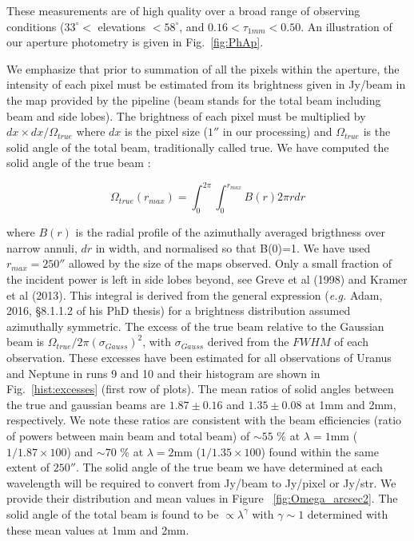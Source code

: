 These measurements are of high quality over a broad range of observing conditions
($33^{\circ}<$ elevations $<58^{\circ}$, and   $0.16 < \tau_{1mm} < 0.50$.
An illustration of our aperture photometry is given in Fig.~\ref{fig:PhAp}.

We emphasize that prior to summation of all the pixels within the aperture, the intensity of each pixel must be estimated
from its brightness  given in Jy/beam in the map provided by the
pipeline (beam stands  for the total beam including beam and side lobes).
The brightness of each pixel must be multiplied by
$dx \times dx / \Omega_{true}$ where  $dx$ is the pixel size ($1''$ in our processing)
and $\Omega_{true}$  is the solid angle of the total beam, traditionally called true.
We have computed the solid angle of the true beam :

$$ \Omega_{true} (r_{max}) = \int_0^{2\pi} \int_0^{r_{max}} B(r) 2 \pi r dr$$

\noindent where $B(r)$ is the radial profile of the azimuthally averaged brigthness over narrow annuli,  $dr$ in width, and normalised so that B(0)=1.
We have used  $r_{max}=250''$ allowed by the size of the maps observed. Only a small fraction of the incident power is
left in side lobes beyond, see Greve et al (1998) and Kramer et al (2013).
This integral is derived from the general expression ({\it e.g.} Adam, 2016, \S 8.1.1.2 of his PhD thesis) for a
brightness distribution assumed azimuthally symmetric.  The excess
of the true beam relative to the Gaussian beam is $\Omega_{true} / 2 \pi (\sigma_{Gauss})^2$, with  $\sigma_{Gauss}$ derived from
the $FWHM$ of each observation. These excesses have been 
estimated  for all observations of Uranus and Neptune in runs 9 and 10 and their histogram are shown
in Fig.~\ref{hist:excesses} (first row of plots). The mean
ratios of solid angles between the true and gaussian beams are
$1.87\pm0.16$  and $1.35\pm0.08$ at 1mm and 2mm, respectively. We note these ratios are consistent with
the beam efficiencies (ratio of powers between main beam  and   total beam)
of $\sim 55$ \% at $\lambda=1$mm ($1/1.87 \times 100$) and $\sim 70$ \% at $\lambda=2$mm ($1/1.35 \times 100$)
found  within the same extent  of $250''$.
The solid angle of the true beam we have determined at each wavelength will be required to convert from
Jy/beam to Jy/pixel or Jy/str. We provide their distribution and mean values in Figure ~\ref{fig:Omega_arcsec2}. 
The solid angle of the total beam is found to be  $\propto \lambda^{\gamma}$ with $\gamma \sim 1$ determined with these mean values
at 1mm and 2mm.  

